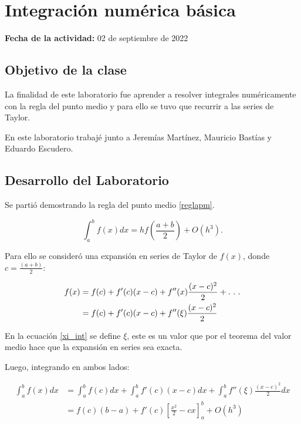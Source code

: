 \documentclass[../portafolio.tex]{subfiles}
\begin{document}
\section{Integración numérica básica}  

\hfill \textbf{Fecha de la actividad:} 02 de septiembre de 2022

\medskip


\subsection{Objetivo de la clase}
La finalidad de este laboratorio fue aprender a resolver integrales numéricamente con la regla del punto medio y para ello se tuvo que recurrir a las series de Taylor.

En este laboratorio trabajé junto a Jeremías Martínez, Mauricio Bastías y Eduardo Escudero.


\subsection{Desarrollo del Laboratorio}

Se partió demostrando la regla del punto medio \ref{reglapm}.

\begin{equation}
    \int _a ^b f(x)dx = hf\left(\frac{a+b}{2}\right)+O(h^3) \label{reglapm}.
\end{equation}

 Para ello se consideró una expansión  en series de Taylor de $f(x)$, donde $c=\frac{(a+b)}{2}$:

\begin{align}
   f(x)  &= f(c) + f'(c) (x-c) + f''(x)\frac{(x-c)^2}{2}+.\ .\ . \notag \\
     &= f(c) + f'(c) (x-c) + f''(\xi)\frac{(x-c)^2}{2} \label{xi_int}
\end{align}

En la ecuación \ref{xi_int} se define $\xi$, este es un valor que por el teorema del valor medio hace que la expansión en series sea exacta.

Luego, integrando en ambos lados:

\begin{align}
    \int_a ^b f(x) dx &=  \int_a ^bf(c)dx + \int_a ^bf'(c) (x-c)dx + \int_a ^bf''(\xi)\frac{(x-c)^2}{2}dx \label{intref1}\\
        &= f(c)(b-a) + f'(c)\left[\frac{x^2}{2} - cx\right]_a ^b + O(h^3) \label{intref2}
\end{align}
\end{document}
